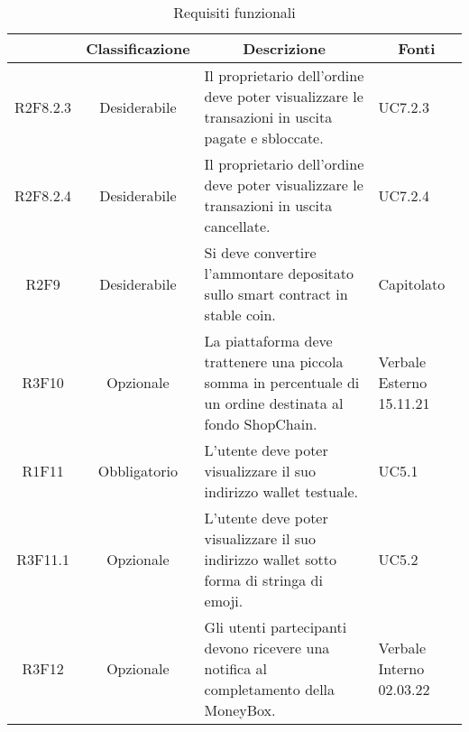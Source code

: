 \begin{table}[H]
    \centering
    \renewcommand{\arraystretch}{1.8}
    \begin{tabular}{c | c | p{6cm} | p{4.1cm}}
        \rowcolor[HTML]{125E28}
        \multicolumn{1}{c}{\color[HTML]{FFFFFF} \textbf{Codice}}            &
        \multicolumn{1}{c}{\color[HTML]{FFFFFF} \textbf{Classificazione}}   &
        \multicolumn{1}{c}{\color[HTML]{FFFFFF} \textbf{Descrizione}}       &
        \multicolumn{1}{c}{\color[HTML]{FFFFFF} \textbf{Fonti}}                                                                                                                                                                    \\
        \hline
        R2F8.2.3                                                            & Desiderabile & Il proprietario dell'ordine deve poter visualizzare le transazioni in uscita pagate e sbloccate.           & UC7.2.3                  \\
        R2F8.2.4                                                            & Desiderabile & Il proprietario dell'ordine deve poter visualizzare le transazioni in uscita cancellate.                   & UC7.2.4                  \\
        R2F9                                                                & Desiderabile & Si deve convertire l'ammontare depositato sullo smart contract in stable coin.                             & Capitolato               \\
        R3F10                                                               & Opzionale    & La piattaforma deve trattenere una piccola somma in percentuale di un ordine destinata al fondo ShopChain. & Verbale Esterno 15.11.21 \\
        R1F11                                                               & Obbligatorio & L'utente deve poter visualizzare il suo indirizzo wallet testuale.                                         & UC5.1                    \\
        R3F11.1                                                             & Opzionale    & L'utente deve poter visualizzare il suo indirizzo wallet sotto forma di stringa di emoji.                  & UC5.2                    \\
        R3F12                                                               & Opzionale    & Gli utenti partecipanti devono ricevere una notifica al completamento della MoneyBox\glo{}.                & Verbale Interno 02.03.22 \\
    \end{tabular}
    \caption{Requisiti funzionali}
\end{table}

